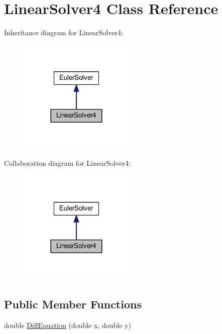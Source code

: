 \hypertarget{classLinearSolver4}{}\section{Linear\+Solver4 Class Reference}
\label{classLinearSolver4}


Inheritance diagram for Linear\+Solver4\+:\nopagebreak
\begin{figure}[H]
\begin{center}
\leavevmode
\includegraphics[width=156pt]{classLinearSolver4__inherit__graph}
\end{center}
\end{figure}


Collaboration diagram for Linear\+Solver4\+:\nopagebreak
\begin{figure}[H]
\begin{center}
\leavevmode
\includegraphics[width=156pt]{classLinearSolver4__coll__graph}
\end{center}
\end{figure}
\subsection*{Public Member Functions}
\begin{DoxyCompactItemize}
\item 
double \hyperlink{classLinearSolver4_a75793f196b389479003e8ea6b9292af0}{Diff\+Equation} (double x, double y)
\end{DoxyCompactItemize}
